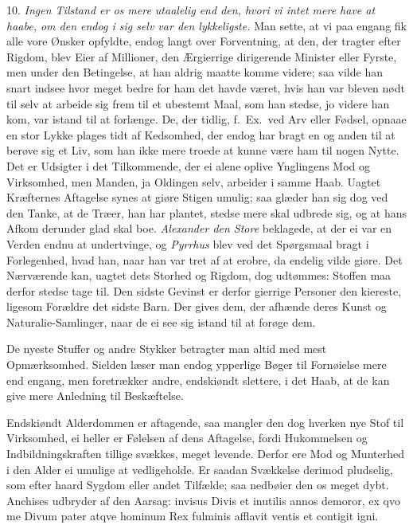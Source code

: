 \documentclass[12pt,a4paper]{article}
\newcommand{\opage}[1]{\marginnote{\footnotesize\textit{[#1]}}}
\begin{document}
10. \emph{Ingen Tilstand er os mere utaalelig end den, hvori vi intet mere have at haabe,
om den endog i sig selv var den lykkeligste.} Man sette, at vi paa engang fik alle vore
Ønsker opfyldte, endog langt over Forventning,
\opage{206} at den, der tragter efter Rigdom, blev Eier af Millioner, den Ærgierrige dirigerende
Minister eller Fyrste, men under den Betingelse, at han aldrig maatte komme videre; saa
vilde han snart indsee hvor meget bedre for ham det havde været, hvis han var bleven nødt
til selv at arbeide sig frem til et ubestemt Maal, som han stedse, jo videre han kom, var
istand til at forlænge. De, der tidlig, f.~Ex.\ ved Arv eller Fødsel, opnaae en stor Lykke
plages tidt af Kedsomhed, der endog har bragt en og anden til at berøve sig et Liv, som han
ikke mere troede at kunne være ham til nogen Nytte. Det er Udsigter i det Tilkommende, der
ei alene oplive Ynglingens Mod og Virksomhed, men Manden, ja Oldingen selv, arbeider i
samme Haab. Uagtet Kræfternes Aftagelse synes at giøre Stigen umulig; saa glæder han sig
dog ved den Tanke, at de Træer, han har plantet, stedse mere skal udbrede sig, og at hans
Afkom derunder glad skal boe. \emph{Alexander den Store} beklagede, at der ei var en Verden
endnu at undertvinge, og \emph{Pyrrhus} blev ved det Spørgsmaal bragt i Forlegenhed, hvad
han, naar han var tret af at erobre, da endelig vilde giøre. Det Nærværende kan, uagtet
dets Storhed og Rigdom, dog udtømmes: Stoffen maa derfor stedse tage til. Den sidste
Gevinst er derfor gierrige Personer den kiereste, ligesom Forældre det sidste Barn. Der
gives dem, der afhænde deres Kunst og Naturalie-Samlinger, naar de ei see sig istand til at
forøge dem.

\opage{207} De nyeste Stuffer og andre Stykker betragter man altid med mest Opmærksomhed. Sielden
læser man endog ypperlige Bøger til Fornøielse mere end engang, men foretrækker andre,
endskiøndt slettere, i det Haab, at de kan give mere Anledning til Beskæftelse.

Endskiøndt Alderdommen er aftagende, saa mangler den dog hverken nye Stof til Virksomhed,
ei heller er Følelsen af dens Aftagelse, fordi Hukommelsen og Indbildningskraften tillige
svækkes, meget levende. Derfor ere Mod og Munterhed i den Alder ei umulige at vedligeholde.
Er saadan Svækkelse derimod pludselig, som efter haard Sygdom eller andet Tilfælde; saa
nedbøier den os meget dybt. Anchises udbryder af den Aarsag: invisus Divis et inutilis
annos demoror, ex qvo me Divum pater atqve hominum Rex fulminis afflavit ventis et contigit
igni.
\end{document}
